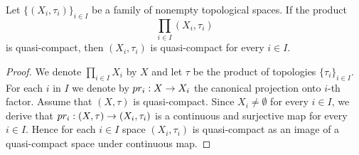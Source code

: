 \begin{theorem}\label{theorem:Tychonoff_theorem_converse}
Let $\big\{\left(X_i,\tau_i\right)\big\}_{i\in I}$ be a family of nonempty topological spaces. If the product
$$\prod_{i\in I}\left(X_i,\tau_i\right)$$
is quasi-compact, then $\left(X_i,\tau_i\right)$ is quasi-compact for every $i\in I$.
\end{theorem}
\begin{proof}
We denote $\prod_{i\in I}X_i$ by $X$ and let $\tau$ be the product of topologies $\{\tau_i\}_{i\in I}$. For each $i$ in $I$ we denote by $pr_i:X \rightarrow X_i$ the canonical projection onto $i$-th factor. Assume that $\left(X,\tau\right)$ is quasi-compact. Since $X_i \neq \emptyset$ for every $i\in I$, we derive that $pr_i:\left(X,\tau\right)\rightarrow \left(X_i,\tau_i\right)$ is a continuous and surjective map for every $i\in I$. Hence for each $i\in I$ space $\left(X_i,\tau_i\right)$ is quasi-compact as an image of a quasi-compact space under continuous map.      
\end{proof}











\small



